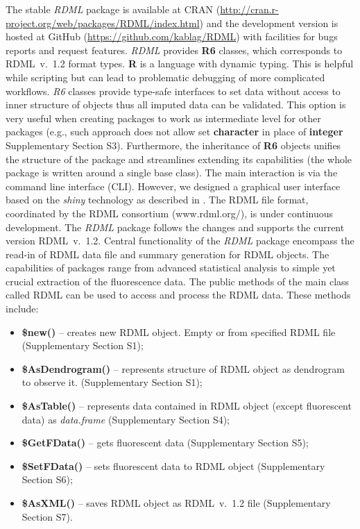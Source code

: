 \documentclass{bioinfo}
\begin{document}
	The stable \textit{RDML} package is available at CRAN 
(\url{http://cran.r-project.org/web/packages/RDML/index.html}) and the 
development version is hosted at GitHub (\url{https://github.com/kablag/RDML}) 
with facilities for bugs reports and request features. \textit{RDML} provides 
\textbf{R6} classes, which corresponds to RDML~v.~1.2 format types. \textbf{R} 
is a language with dynamic typing. This is helpful while scripting but can lead 
to problematic debugging of more complicated workflows. \emph{R6} classes 
provide type-safe interfaces to set data without access to inner structure of 
objects thus all imputed data can be validated. This option is very useful when 
creating packages to work as intermediate level for other packages (e.g., such 
approach does not allow set \textbf{character} in place of \textbf{integer} 
Supplementary Section S3). Furthermore, the inheritance of \textbf{R6} objects 
unifies the structure of the package and streamlines extending its capabilities 
(the whole package is written around a single base class). The main interaction 
is via the command line interface (CLI). However, we designed a graphical user 
interface based on the \textit{shiny} technology as described in 
\cite{roediger2015chippcr}. The RDML file format, coordinated by the RDML 
consortium (www.rdml.org/), is under continuous development. The \textit{RDML} 
package follows the changes and supports the current version RDML~v.~1.2. 
Central functionality of the \textit{RDML} package encompass the read-in of RDML 
data file and summary generation for RDML objects. The capabilities of packages 
range from advanced statistical analysis to simple yet crucial extraction of the 
fluorescence data. The public methods of the main class called RDML can be used 
to access and process the RDML data. These methods include:

\begin{itemize} 
  \item \textbf{\$new()} -- creates new RDML object. Empty or from specified RDML 
  file (Supplementary Section S1); \item \textbf{\$AsDendrogram()} -- represents 
  structure of RDML object as dendrogram to observe it. (Supplementary Section 
  S1);
  \item \textbf{\$AsTable()} -- represents data contained in RDML object (except 
  fluorescent data) as \textit{data.frame} (Supplementary Section S4);
  \item \textbf{\$GetFData()} -- gets fluorescent data (Supplementary Section S5);
  \item \textbf{\$SetFData()} -- sets fluorescent data to RDML object (Supplementary Section S6); 
  \item \textbf{\$AsXML()} -- saves RDML object as RDML~v.~1.2 file (Supplementary Section S7).
\end{itemize}
	
\end{document}
